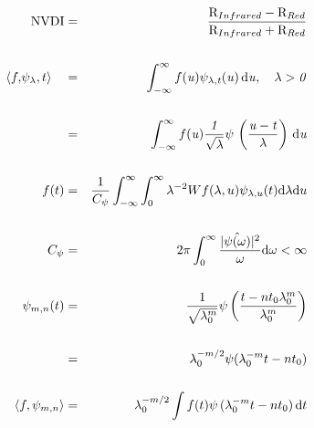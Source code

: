 \documentclass[12pt,oneside,reqno]{amsart}
\begin{document}
 
\begin{eqnarray*}
    \textnormal{NVDI}&=&\frac{\textnormal{R}_{Infrared}-\textnormal{R}_{Red}}{\textnormal{R}_{Infrared}+{\textnormal{R}_{Red}}}\\
    \vspace{2cm}\\
    \langle{f,}\psi_\lambda,t \rangle \quad &=&\quad\int_{-\infty}^\infty f(\it u)\psi_{\lambda,t}(\it u)\, \textnormal{d}u,\quad \lambda>0\\
    \vspace{1cm}\\
    \space&=&\quad\int_{-\infty}^\infty f(\it u)\frac{1}{\sqrt{\lambda}}\psi\, \left(\frac{u-t}{\lambda}\right)\, \textnormal{d}u\\
    \vspace{2cm}\\
    f(t)&=&\frac{1}{C_{\psi}}\int_{-\infty}^\infty\int_{0}^\infty \lambda^{-2}W f(\lambda,u)\psi_{\lambda,u}(t)\textnormal{d}\lambda \textnormal{d}u\\
    \vspace{2cm}\\
    C_{\psi}&=&2\pi\int_{0}^\infty\frac{|\hat{\psi(\omega)}|^{2}}{\omega}\textnormal{d}\omega < \infty\\
    \vspace{2cm}\\
    \psi_{m,n}(t)&=&\frac{1}{\sqrt{\lambda_{0}^m}}\psi\left(\frac{t-nt_{0}\lambda_{0}^m}{\lambda_{0}^{m}}\right)\\
    \vspace{1.5cm}\\
    \space&=&\lambda_{0}^{-m/2}\psi(\lambda_{0}^{-m}t-nt_{0})\\
    \vspace{2cm}\\
    \langle f,\psi_{m,n}\rangle&=&\lambda_{0}^{-m/2}\int f(t)\psi\, (\lambda_{0}^{-m}t-nt_{0})\, \textnormal{d}t\\
\end{eqnarray*}
\end{document}
